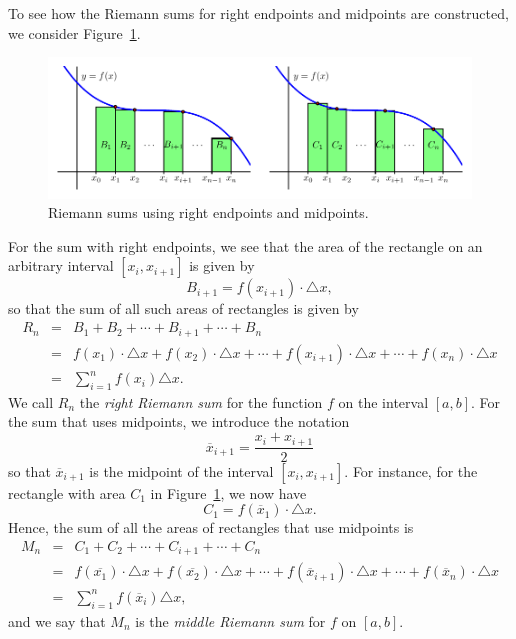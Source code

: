 To see how the Riemann sums for right endpoints and midpoints are constructed, we consider Figure~\ref{F:4.2.RightMidSum}.
\begin{figure}[h]
\begin{center}
\includegraphics{figures/4_2_RightMidSum}
\caption{Riemann sums using right endpoints and midpoints.} \label{F:4.2.RightMidSum}
\end{center}
\end{figure}
For the sum with right endpoints, we see that the area of the rectangle on an arbitrary interval $[x_i, x_{i+1}]$ is given by
$$B_{i+1} = f(x_{i+1}) \cdot \triangle x,$$
so that the sum of all such areas of rectangles is given by
\begin{eqnarray*}
R_n & = & B_1 + B_2 + \cdots + B_{i+1} + \cdots + B_n \\
	& = &  f(x_1) \cdot \triangle x + f(x_2) \cdot \triangle x + \cdots + f(x_{i+1}) \cdot \triangle x + \cdots + f(x_{n}) \cdot \triangle x \\ 
	& = & \sum_{i=1}^{n} f(x_i) \triangle x.
\end{eqnarray*}
We call $R_n$ the \emph{right Riemann sum}  for the function $f$ on the interval $[a,b]$.  For the sum that uses midpoints, we introduce the notation
$$\overline{x}_{i+1} = \frac{x_{i} + x_{i+1}}{2}$$
so that $\overline{x}_{i+1}$ is the midpoint of the interval $[x_i, x_{i+1}]$.  For instance, for the rectangle with area $C_1$ in Figure~\ref{F:4.2.RightMidSum}, we now have
$$C_1 = f(\overline{x}_1) \cdot \triangle x.$$
Hence, the sum of all the areas of rectangles that use midpoints is 
\begin{eqnarray*}
M_n & = & C_1 + C_2 + \cdots + C_{i+1} + \cdots + C_n \\
	& = &  f(\overline{x_1}) \cdot \triangle x + f(\overline{x_2}) \cdot \triangle x + \cdots + f(\overline{x}_{i+1}) \cdot \triangle x + \cdots + f(\overline{x}_{n}) \cdot \triangle x \\ 
	& = & \sum_{i=1}^{n} f(\overline{x}_i) \triangle x,
\end{eqnarray*}
and we say that $M_n$ is the \emph{middle Riemann sum}  for $f$ on $[a,b]$.


